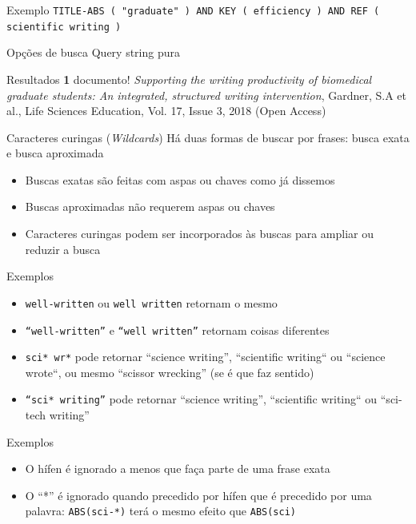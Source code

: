 \begin{frame}
\begin{block}{Exemplo}
\texttt{TITLE-ABS ( "graduate" )  AND  KEY ( efficiency )  AND  REF ( {scientific writing} ) }
\end{block}
\begin{block}{Opções de busca}
Query string pura
\end{block}
\begin{block}{Resultados}
\textbf{1} documento!
\textit{Supporting the writing productivity of biomedical graduate students: An integrated, structured writing intervention}, Gardner, S.A et al., Life Sciences Education, Vol. 17, Issue 3, 2018 (Open Access)
\end{block}
\end{frame}


\begin{frame}{Caracteres curingas (\textit{Wildcards})}
Há duas formas de buscar por frases: busca exata e busca aproximada

\begin{itemize}
\item Buscas exatas são feitas com aspas ou chaves como já dissemos 
\item Buscas aproximadas não requerem aspas ou chaves 
\item Caracteres curingas podem ser incorporados às buscas para ampliar ou reduzir a busca
\end{itemize}
\end{frame}

\begin{frame}{Exemplos}
\begin{itemize}
\item \texttt{well-written} ou \texttt{well written} retornam o mesmo
\item \texttt{``well-written''} e \texttt{``well written''} retornam coisas diferentes
\item \texttt{sci* wr*} pode retornar ``science writing'', ``scientific writing`` ou ``science wrote``, ou mesmo ``scissor wrecking'' (se é que faz sentido)
\item \texttt{``sci* writing''} pode retornar ``science writing'', ``scientific writing`` ou ``sci-tech writing''
\end{itemize}
\end{frame}

\begin{frame}{Exemplos}
\begin{itemize}
\item O hífen é ignorado a menos que faça parte de uma frase exata
\item O ``*'' é ignorado quando precedido por hífen que é precedido por uma palavra:
\texttt{ABS(sci-*)} terá o mesmo efeito que \texttt{ABS(sci)}
\end{itemize}
\end{frame}

